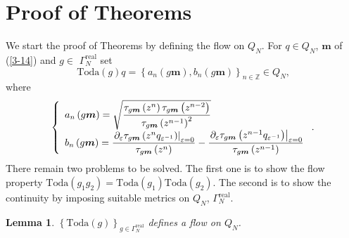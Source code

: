 \documentclass[a4paper]{article}%
\newtheorem{lemma}{Lemma}
\begin{document}
\section{Proof of Theorems}

We start the proof of Theorems by defining the flow on $Q_{N}$. For $q\in
Q_{N}$, $\boldsymbol{m}$ of (\ref{3-14}) and $g\in$ $\Gamma_{N}%
^{\operatorname{real}}$ set%
\begin{equation}
\mathrm{Toda}\left(  g\right)  q=\left\{  a_{n}\left(  g\boldsymbol{m}\right)
,b_{n}\left(  g\boldsymbol{m}\right)  \right\}  _{n\in\mathbb{Z}}\in
Q_{N}\text{,} \label{4-1}%
\end{equation}
where%
\[
\left\{
\begin{array}
[c]{l}%
a_{n}\left(  g\boldsymbol{m}\right)  =\sqrt{\dfrac{\tau_{g\boldsymbol{m}%
}\left(  z^{n}\right)  \tau_{g\boldsymbol{m}}\left(  z^{n-2}\right)  }%
{\tau_{g\boldsymbol{m}}\left(  z^{n-1}\right)  ^{2}}}\\
b_{n}\left(  g\boldsymbol{m}\right)  =\dfrac{\left.  \partial_{\varepsilon
}\tau_{g\boldsymbol{m}}\left(  z^{n}q_{\varepsilon^{-1}}\right)  \right\vert
_{\varepsilon=0}}{\tau_{g\boldsymbol{m}}\left(  z^{n}\right)  }-\dfrac{\left.
\partial_{\varepsilon}\tau_{g\boldsymbol{m}}\left(  z^{n-1}q_{\varepsilon
^{-1}}\right)  \right\vert _{\varepsilon=0}}{\tau_{g\boldsymbol{m}}\left(
z^{n-1}\right)  }%
\end{array}
\right.  \text{.}%
\]
There remain two problems to be solved. The first one is to show the flow
property $\mathrm{Toda}\left(  g_{1}g_{2}\right)  =\mathrm{Toda}\left(
g_{1}\right)  \mathrm{Toda}\left(  g_{2}\right)  $. The second is to show the
continuity by imposing suitable metrics on $Q_{N}$, $\Gamma_{N}%
^{\operatorname{real}}$.

\begin{lemma}
$\left\{  \mathrm{Toda}\left(  g\right)  \right\}  _{g\in\Gamma_{N}%
^{\operatorname{real}}}$ defines a flow on $Q_{N}$.
\end{lemma}
\end{document}
